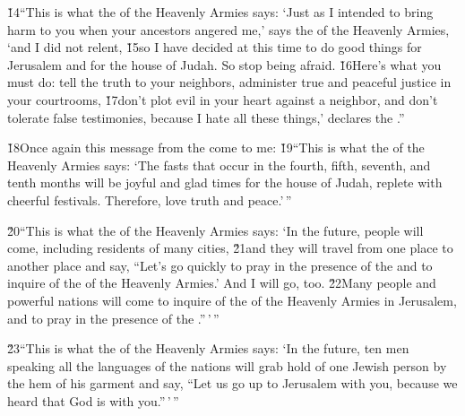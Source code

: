 \v{14}``This is what the  of the Heavenly Armies says: `Just as I intended to bring harm to you when your ancestors angered me,' says the  of the Heavenly Armies, `and I did not relent, \v{15}so I have decided at this time to do good things for Jerusalem and for the house of Judah. So stop being afraid. \v{16}Here's what you must do: tell the truth to your neighbors, administer true and peaceful justice in your courtrooms, \v{17}don't plot evil in your heart against a neighbor, and don't tolerate false testimonies, because I hate all these things,' declares the .''

\v{18}Once again this message from the  come to me: \v{19}``This is what the  of the Heavenly Armies says: `The fasts that occur in the fourth, fifth, seventh, and tenth months will be joyful and glad times for the house of Judah, replete with cheerful festivals. Therefore, love truth and peace.'\,''

\v{20}``This is what the  of the Heavenly Armies says: `In the future, people will come, including residents of many cities, \v{21}and they will travel from one place to another place and say, ``Let's go quickly to pray in the presence of the  and to inquire of the  of the Heavenly Armies.' And I will go, too. \v{22}Many people and powerful nations will come to inquire of the  of the Heavenly Armies in Jerusalem, and to pray in the presence of the .''\,'\,''

\v{23}``This is what the  of the Heavenly Armies says: `In the future, ten men speaking all the languages of the nations will grab hold of one Jewish person by the hem of his garment and say, ``Let us go up to Jerusalem with you, because we heard that God is with you.''\,'\,''

